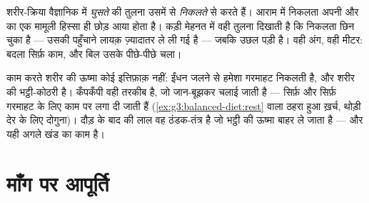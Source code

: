 \begin{example}[पेशी के दोनों सिरों पर नापना]\label{ex:g7:organs-at-work:measure}
शरीर-क्रिया वैज्ञानिक  में \emph{घुसते}  की तुलना उसमें से
\emph{निकलते}  से करते हैं। आराम में निकलता  अपनी  और
 का एक मामूली हिस्सा ही छोड़ आया होता है। कड़ी मेहनत में वही
तुलना दिखाती है कि निकलता  छिन चुका है --- उसकी पहुँचाने लायक़
ज़्यादातर  ले ली गई है --- जबकि  उछल पड़ी है।
वही अंग, वही मीटर: बदला सिर्फ़ काम, और बिल उसके पीछे-पीछे चला।
\end{example}

\begin{remark}[गरमाहट ही रसीद है]\label{rem:g7:organs-at-work:warmth}
काम करते शरीर की ऊष्मा कोई इत्तिफ़ाक़ नहीं: ईंधन जलने से हमेशा गरमाहट
निकलती है, और  शरीर की भट्ठी-कोठरी है। कँपकँपी वही तरकीब है, जो
जान-बूझकर चलाई जाती है ---  सिर्फ़ और सिर्फ़ गरमाहट के लिए काम पर
लगा दी जाती हैं (\cref{ex:g3:balanced-diet:rest} वाला ठहरा हुआ ख़र्च,
थोड़ी देर के लिए दोगुना)। दौड़ के बाद की लाल  वह ठंडक-तंत्र है जो
भट्ठी की ऊष्मा बाहर ले जाता है --- और यही अगले खंड का काम है।
\end{remark}

\section{माँग पर आपूर्ति}

